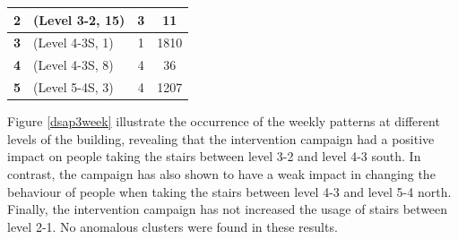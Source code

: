 \begin{table}[t]
\begin{tabular}{clcc}
\textbf{2}             & (Level 3-2, 15)                                                                     & 3                                                                           & 11                                                                                      \\ \hline
\textbf{3}             & (Level 4-3S, 1)                                                                      & 1                                                                           & 1810                                                                                    \\ \hline
\textbf{4}             & (Level 4-3S, 8)                                                                      & 4                                                                           & 36                                                                                      \\ \hline
\textbf{5}             & (Level 5-4S, 3)                                                                      & 4                                                                           & 1207                                                                                    \\ \hline\midrule
\end{tabular}
\end{table}

Figure \ref{dsap3week} illustrate the occurrence of the weekly patterns at different levels of the building, revealing that the intervention campaign had a positive impact on people taking the stairs between level 3-2 and level 4-3 south. In contrast, the campaign has also shown to have a weak impact in changing the behaviour of people when taking the stairs between level 4-3 and level 5-4 north. Finally, the intervention campaign has not increased the usage of stairs between level 2-1. No anomalous clusters were found in these results. 


